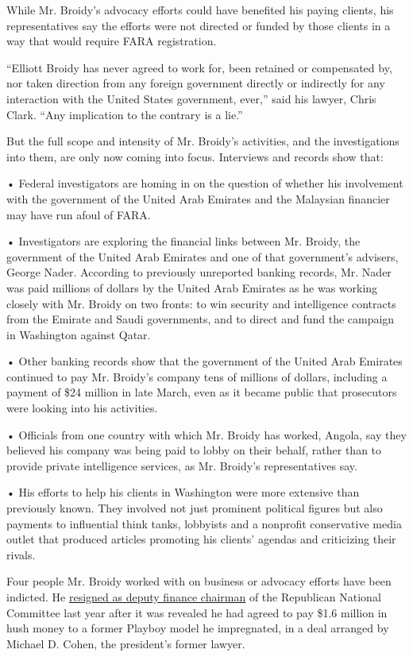 While Mr. Broidy's advocacy efforts could have benefited his paying
clients, his representatives say the efforts were not directed or funded
by those clients in a way that would require FARA registration.

``Elliott Broidy has never agreed to work for, been retained or
compensated by, nor taken direction from any foreign government directly
or indirectly for any interaction with the United States government,
ever,'' said his lawyer, Chris Clark. ``Any implication to the contrary
is a lie.''

But the full scope and intensity of Mr. Broidy's activities, and the
investigations into them, are only now coming into focus. Interviews and
records show that:

• Federal investigators are homing in on the question of whether his
involvement with the government of the United Arab Emirates and the
Malaysian financier may have run afoul of FARA.

• Investigators are exploring the financial links between Mr. Broidy,
the government of the United Arab Emirates and one of that government's
advisers, George Nader. According to previously unreported banking
records, Mr. Nader was paid millions of dollars by the United Arab
Emirates as he was working closely with Mr. Broidy on two fronts: to win
security and intelligence contracts from the Emirate and Saudi
governments, and to direct and fund the campaign in Washington against
Qatar.

• Other banking records show that the government of the United Arab
Emirates continued to pay Mr. Broidy's company tens of millions of
dollars, including a payment of \$24 million in late March, even as it
became public that prosecutors were looking into his activities.

• Officials from one country with which Mr. Broidy has worked, Angola,
say they believed his company was being paid to lobby on their behalf,
rather than to provide private intelligence services, as Mr. Broidy's
representatives say.

• His efforts to help his clients in Washington were more extensive than
previously known. They involved not just prominent political figures but
also payments to influential think tanks, lobbyists and a nonprofit
conservative media outlet that produced articles promoting his clients'
agendas and criticizing their rivals.

Four people Mr. Broidy worked with on business or advocacy efforts have
been indicted. He
\href{https://www.nytimes.com/2018/04/13/us/politics/elliott-broidy-michael-cohen-payout.html?module=inline}{resigned
as deputy finance chairman} of the Republican National Committee last
year after it was revealed he had agreed to pay \$1.6 million in hush
money to a former Playboy model he impregnated, in a deal arranged by
Michael D. Cohen, the president's former lawyer.

